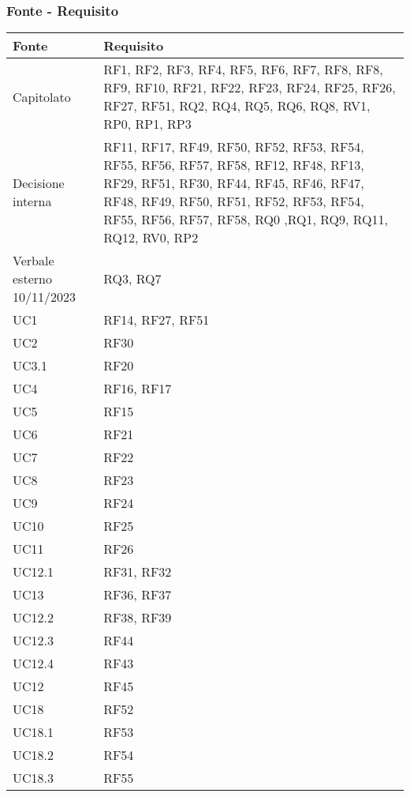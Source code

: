   \subsubsection{Fonte - Requisito}

\begin{center}
  \begin{longtable}{|C{5cm}|C{5cm}|}
    \hline
    \textbf{Fonte} & \textbf{Requisito} \\
    \hline
    Capitolato & RF1, RF2, RF3, RF4, RF5, RF6, RF7, RF8, RF8, RF9, RF10, RF21, RF22, RF23, RF24, RF25, RF26, RF27, RF51, RQ2, RQ4, RQ5, RQ6, RQ8, RV1, RP0, RP1, RP3  \\
    \hline
    Decisione interna & RF11, RF17, RF49, RF50, RF52, RF53, RF54, RF55, RF56, RF57, RF58, RF12, RF48, RF13, RF29, RF51, RF30, RF44, RF45, RF46, RF47, RF48, RF49, RF50, RF51, RF52, RF53, RF54, RF55, RF56, RF57, RF58, RQ0 ,RQ1, RQ9, RQ11, RQ12, RV0, RP2 \\
    \hline
    Verbale esterno 10/11/2023 & RQ3, RQ7 \\
    \hline
    UC1 & RF14, RF27, RF51 \\
    \hline
    UC2 & RF30 \\
    \hline
    UC3.1 & RF20 \\
    \hline
    UC4 & RF16, RF17 \\
    \hline
    UC5 & RF15 \\
    \hline
    UC6 & RF21 \\
    \hline
    UC7 & RF22 \\
    \hline
    UC8 & RF23 \\
    \hline
    UC9 & RF24 \\
    \hline
    UC10 & RF25 \\
    \hline
    UC11 & RF26 \\
    \hline
    UC12.1 & RF31, RF32 \\
    \hline
    UC13 & RF36, RF37 \\
    \hline
    UC12.2 &  RF38, RF39 \\
    \hline
    UC12.3 & RF44 \\
    \hline
    UC12.4 & RF43 \\
    \hline
    UC12 & RF45 \\
    \hline
    UC18 & RF52 \\
    \hline
    UC18.1 & RF53 \\
    \hline
    UC18.2 & RF54 \\
    \hline
    UC18.3 & RF55 \\
    \hline

\end{longtable}
\end{center}
